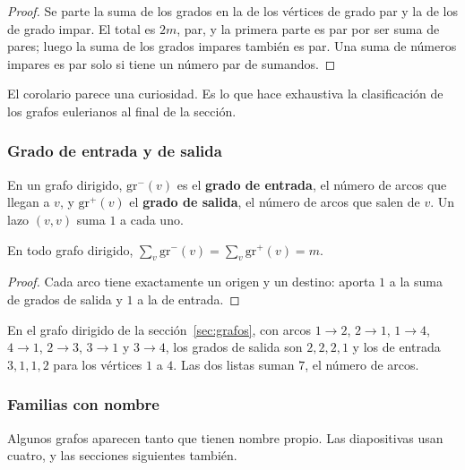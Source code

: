 \documentclass[11pt,letterpaper]{article}
\begin{document}
\begin{proof}
  Se parte la suma de los grados en la de los vértices de grado par y
  la de los de grado impar. El total es $2m$, par, y la primera parte
  es par por ser suma de pares; luego la suma de los grados impares
  también es par. Una suma de números impares es par solo si tiene un
  número par de sumandos.
\end{proof}

El corolario parece una curiosidad. Es lo que hace exhaustiva la
clasificación de los grafos eulerianos al final de la sección.

\subsubsection*{Grado de entrada y de salida}

En un grafo dirigido, $\text{gr}^{-}(v)$ es el \textbf{grado de
entrada}, el número de arcos que llegan a $v$, y $\text{gr}^{+}(v)$ el
\textbf{grado de salida}, el número de arcos que salen de $v$. Un lazo
$(v, v)$ suma $1$ a cada uno.

\begin{proposicion}
  \label{prop:grados-dirigidos}
  En todo grafo dirigido,
  $\sum_{v} \text{gr}^{-}(v) = \sum_{v} \text{gr}^{+}(v) = m$.
\end{proposicion}

\begin{proof}
  Cada arco tiene exactamente un origen y un destino: aporta $1$ a la
  suma de grados de salida y $1$ a la de entrada.
\end{proof}

En el grafo dirigido de la sección~\ref{sec:grafos}, con arcos
$1 \to 2$, $2 \to 1$, $1 \to 4$, $4 \to 1$, $2 \to 3$, $3 \to 1$ y
$3 \to 4$, los grados de salida son $2, 2, 2, 1$ y los de entrada
$3, 1, 1, 2$ para los vértices $1$ a $4$. Las dos listas suman $7$, el
número de arcos.

\subsubsection*{Familias con nombre}

Algunos grafos aparecen tanto que tienen nombre propio. Las
diapositivas usan cuatro, y las secciones siguientes también.
\end{document}
